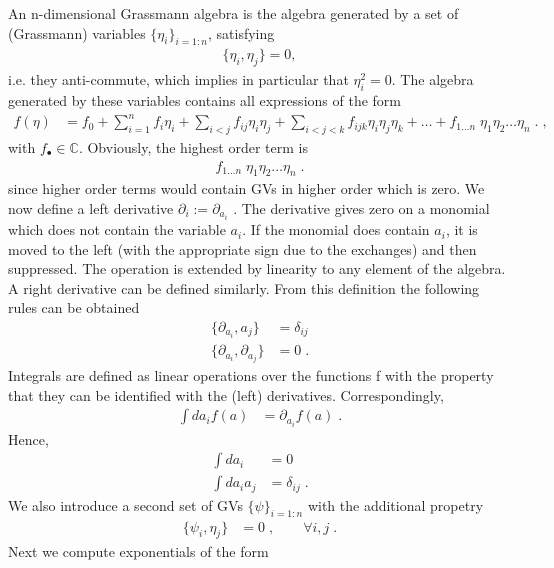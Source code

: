 An n-dimensional Grassmann algebra is the algebra generated by a set of (Grassmann) variables $\{\eta_{i}\}_{i=1:n}$,  satisfying
%
\begin{align}\label{eq:}
\{\eta_{i},\eta_{j}\}=0,  
\end{align}
%
i.e. they anti-commute, which implies in particular that $\eta_{i}^{2} = 0$. The algebra generated by these variables contains all expressions of the form
%
\begin{align*}
f(\eta) &= f_{0} + \sum_{i=1}^{n} f_{i} \eta_{i} + \sum_{i< j} f_{ij} \eta_{i} \eta_{j}
+\sum_{i< j<k} f_{ijk} \eta_{i} \eta_{j} \eta_{k} +\ldots + f_{1\ldots n}\; \eta_{1} \eta_{2} \ldots \eta_{n}\;. \;,
\end{align*}
%
with $f_{\bullet}\in \mathbb{C}$.
Obviously, the highest order term is 
%
\begin{align*}
f_{1\ldots n}\; \eta_{1} \eta_{2} \ldots \eta_{n}\;.
\end{align*}
%
since higher order terms would contain GVs in higher order which is zero.
%
We now define a left derivative $\partial_{i} := \partial_{a_{i}}$ . 
The derivative gives zero on a monomial which does not contain the variable $a_{i}$. 
If the monomial does contain $a_{i}$, it is moved to the left (with the appropriate sign due to the exchanges) and then suppressed. 
The operation is extended by linearity to any element of the algebra. 
A right derivative can be defined similarly. 
From this definition the following rules can be obtained
%
\begin{align*}
\{\partial_{a_{i}}, a_{j}\} &= \delta_{ij}\\
\{\partial_{a_{i}}, \partial_{a_{j}}\} &= 0\;.
\end{align*}
%
Integrals are defined as linear operations over the functions f with the property that they 
can be identified with the (left) derivatives. Correspondingly,
%
%
\begin{align}\label{eq:}
\int da_{i} f(a) &= \partial_{ a_{i}} f(a)\;.
\end{align}
%
Hence,
%
\begin{align*}
\int da_{i}  &= 0\\
\int da_{i} a_{j} &= \delta_{ij}\;.
\end{align*}
%
We also introduce a second set of GVs $\{\psi\}_{i=1:n}$ with the additional propetry
%
\begin{align*}
\{\psi_{i},\eta_{j}\} &= 0\;,\qquad \forall i,j\;.
\end{align*}
%
Next we compute exponentials of the form

